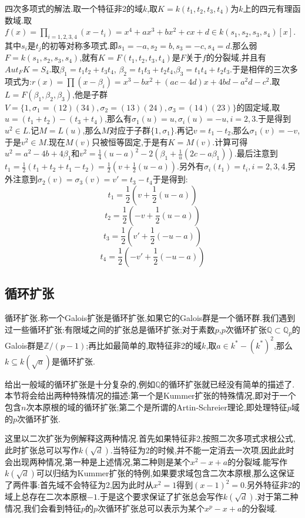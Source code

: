四次多项式的解法.取一个特征非2的域$k$,取$K=k(t_1,t_2,t_3,t_4)$为$k$上的四元有理函数域.取$f(x)=\prod_ {i=1,2,3,4}(x-t_i)=x^4+ax^3+bx^2+cx+d\in k(s_1,s_2,s_3,s_4)[x]$.其中$s_i$是$t_j$的初等对称多项式.即$s_1=-a,s_2=b,s_3=-c,s_4=d$.那么弱$F=k(s_1,s_2,s_3,s_4)$,就有$K=F(t_1,t_2,t_3,t_4)$是$F$关于$f$的分裂域,并且有$Aut_FK=S_4$.取$\beta_1=t_1t_2+t_3t_4$, $\beta_2=t_1t_3+t_2t_4$,$\beta_3=t_1t_4+t_2t_3$.于是相伴的三次多项式为:$r(x)=\prod(x-\beta_i)=x^3-bx^2+(ac-4d)x+4bd-a^2d-c^2$.取$L=F(\beta_1,\beta_2,\beta_3)$,他是子群$V=\{1,\sigma_1=(12) (34),\sigma_2=(13)(24),\sigma_3=(14)(23)\}$的固定域,取$u= (t_1+t_2)-(t_3+t_4)$,那么有$\sigma_1(u)=u,\sigma_i(u)=-u,i=2,3$.于是得到$u^2\in L$.记$M=L(u)$,那么$M$对应于子群$\{1,\sigma_1\}$.再记$v=t_1-t_2$,那么$\sigma_1(v)=-v$,于是$v^2\in M$.现在$M(v)$只被恒等固定,于是有$K=M(v)$.计算可得$u^2=a^2-4b+4\beta_1$和$v^2=\frac{1} {4}(u-a)^2-2\left(\beta_1+\frac{1}{u}(2c-a\beta_1)\right)$.最后注意到$t_1=\frac{1} {2}(t_1+t_2+t_1-t_2)=\frac{1}{2}\left(v+\frac{1}{2}(u-a)\right)$.另外有$\sigma_i(t_1)=t_i,i=2,3,4$.另外注意到$\sigma_2(v)=\sigma_3(v)=v'=t_3-t_4$于是得到:
$$t_1=\frac{1}{2}\left(v+\frac{1}{2}(u-a)\right)$$
$$t_2=\frac{1}{2}\left(-v+\frac{1}{2}(u-a)\right)$$
$$t_3=\frac{1}{2}\left(v'+\frac{1}{2}(-u-a)\right)$$
$$t_4=\frac{1}{2}\left(-v'+\frac{1}{2}(-u-a)\right)$$
\newpage
\subsection{循环扩张}

循环扩张.称一个Galois扩张是循环扩张,如果它的Galois群是一个循环群.我们遇到过一些循环扩张:有限域之间的扩张总是循环扩张;对于素数$p$,$p$次循环扩张$\mathbb{Q}\subset\mathbb{Q}_p$的Galois群是$\mathbb{Z}/(p-1)$;再比如最简单的,取特征非2的域$k$,取$a\in k^*-(k^*)^2$,那么$k\subseteq k(\sqrt{a})$是循环扩张.

给出一般域的循环扩张是十分复杂的,例如$\mathbb{Q}$的循环扩张就已经没有简单的描述了.本节将会给出两种特殊情况的描述:第一个是Kummer扩张的特殊情况,即对于一个包含$n$次本原根的域的循环扩张;第二个是所谓的Artin-Schreier理论,即处理特征$p$域的$p$次循环扩张.

这里以二次扩张为例解释这两种情况.首先如果特征非2,按照二次多项式求根公式,此时扩张总可以写作$k(\sqrt{d})$.当特征为2的时候,并不能一定消去一次项,因此此时会出现两种情况,第一种是上述情况,第二种则是某个$x^2-x+a$的分裂域.能写作$k(\sqrt{d})$可以归结为Kummer扩张的特例,如果要求域包含二次本原根,那么这保证了两件事:首先域不会特征为2,因为此时从$x^2=1$得到$(x-1)^2=0$.另外特征非2的域上总存在二次本原根$-1$.于是这个要求保证了扩张总会写作$k(\sqrt{d})$.对于第二种情况,我们会看到特征$p$的$p$次循环扩张总可以表示为某个$x^p-x+a$的分裂域.

